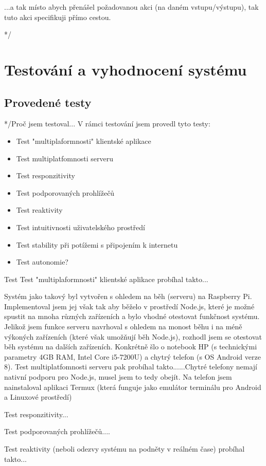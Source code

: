...a tak místo abych přenášel požadovanou akci (na daném vstupu/výstupu), tak tuto akci specifikuji přímo cestou.

*/
\section{Testování a vyhodnocení systému}


\subsection*{Provedené testy}
\label{provedene-testy}
*/Proč jsem testoval...
V rámci testování jsem provedl tyto testy:
\begin{itemize}
    \item Test "multiplaformnosti" klientské aplikace
    \item Test multiplatfomnosti serveru
    \item Test responzitivity
    \item Test podporovaných prohlížečů
    \item Test reaktivity
    \item Test intuitivnosti uživatelského prostředí
    \item Test stability při potížemi s připojením k internetu
    \item Test autonomie?
\end{itemize}

Test Test "multiplaformnosti" klientské aplikace probíhal takto...

Systém jako takový byl vytvořen s ohledem na běh (serveru) na Raspberry Pi. Implementoval jsem jej však tak aby běželo v prostředí Node.js, které je možné spustit na mnoha různých zařízeních a bylo vhodné otestovat funkčnost systému. Jelikož jsem funkce serveru navrhoval s ohledem na monost běhu i na méně výkoných zařízeních (které však umožňují běh Node.js), rozhodl jsem se otestovat běh systému na dalších zařízeních. Konkrétně šlo o notebook HP (s technickými parametry 4GB RAM, Intel Core i5-7200U) a chytrý telefon (s OS Android verze 8). Test multiplatfomnosti serveru pak probíhal takto......Chytré telefony nemají nativní podporu pro Node.js, musel jsem to tedy obejít. Na telefon jsem nainstaloval aplikaci Termux (která funguje jako emulátor terminálu pro Android a Linuxové prostředí)

Test responzitivity...

Test podporovaných prohlížečů....


Test reaktivity (neboli odezvy systému na podněty v reálném čase) probíhal takto...

